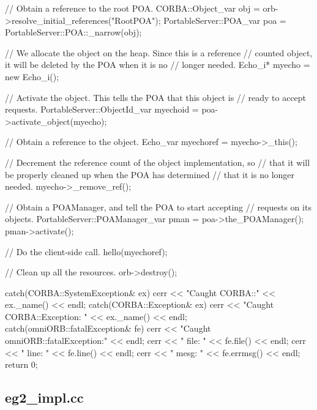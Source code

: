 \documentclass[11pt,twoside,a4paper]{book}
\begin{document}
\begin{cxxlisting}
{{    // Obtain a reference to the root POA.
    CORBA::Object_var obj = orb->resolve_initial_references("RootPOA");
    PortableServer::POA_var poa = PortableServer::POA::_narrow(obj);

      // We allocate the object on the heap.  Since this is a reference
      // counted object, it will be deleted by the POA when it is no
      // longer needed.
    Echo_i* myecho = new Echo_i();

    // Activate the object.  This tells the POA that this object is
    // ready to accept requests.
    PortableServer::ObjectId_var myechoid = poa->activate_object(myecho);

      // Obtain a reference to the object.
    Echo_var myechoref = myecho->_this();

    // Decrement the reference count of the object implementation, so
    // that it will be properly cleaned up when the POA has determined
    // that it is no longer needed.
    myecho->_remove_ref();

    // Obtain a POAManager, and tell the POA to start accepting
    // requests on its objects.
    PortableServer::POAManager_var pman = poa->the_POAManager();
    pman->activate();

    // Do the client-side call.
    hello(myechoref);

    // Clean up all the resources.
    orb->destroy();
  }
  catch(CORBA::SystemException& ex) {
    cerr << "Caught CORBA::" << ex._name() << endl;
  }
  catch(CORBA::Exception& ex) {
    cerr << "Caught CORBA::Exception: " << ex._name() << endl;
  }
  catch(omniORB::fatalException& fe) {
    cerr << "Caught omniORB::fatalException:" << endl;
    cerr << "  file: " << fe.file() << endl;
    cerr << "  line: " << fe.line() << endl;
    cerr << "  mesg: " << fe.errmsg() << endl;
  }
  return 0;
}
\end{cxxlisting}


\clearpage
\subsection{eg2\_impl.cc}
\end{document}
